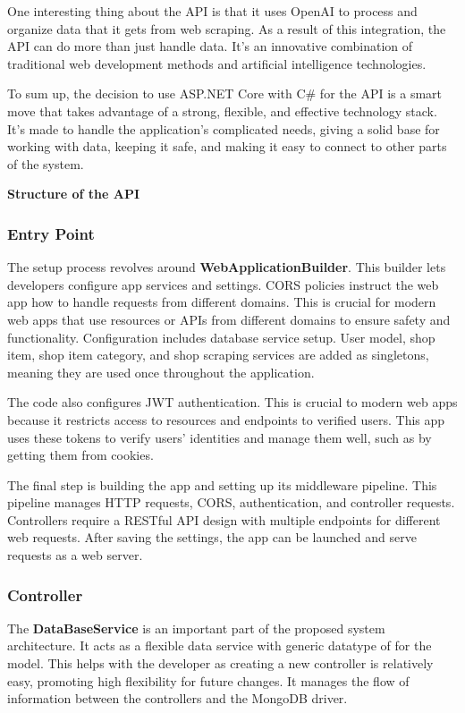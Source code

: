 One interesting thing about the API is that it uses OpenAI to process and organize data that it gets from web scraping. As a result of this integration, the API can do more than just handle data. It's an innovative combination of traditional web development methods and artificial intelligence technologies.

\newpage

To sum up, the decision to use ASP.NET Core with C\# for the API is a smart move that takes advantage of a strong, flexible, and effective technology stack. It's made to handle the application's complicated needs, giving a solid base for working with data, keeping it safe, and making it easy to connect to other parts of the system.

\noindent\textbf{Structure of the API}

\subsubsection{Entry Point}

The setup process revolves around \textbf{WebApplicationBuilder}. This builder lets developers configure app services and settings. CORS policies instruct the web app how to handle requests from different domains. This is crucial for modern web apps that use resources or APIs from different domains to ensure safety and functionality. Configuration includes database service setup. User model, shop item, shop item category, and shop scraping services are added as singletons, meaning they are used once throughout the application.

The code also configures JWT authentication. This is crucial to modern web apps because it restricts access to resources and endpoints to verified users. This app uses these tokens to verify users' identities and manage them well, such as by getting them from cookies.

The final step is building the app and setting up its middleware pipeline. This pipeline manages HTTP requests, CORS, authentication, and controller requests. Controllers require a RESTful API design with multiple endpoints for different web requests. After saving the settings, the app can be launched and serve requests as a web server.

\subsubsection{Controller}

The \textbf{DataBaseService} is an important part of the proposed system architecture. It acts as a flexible data service with generic datatype of for the model. This helps with the developer as creating a new controller is relatively easy, promoting high flexibility for future changes. It manages the flow of information between the controllers and the MongoDB driver.  

